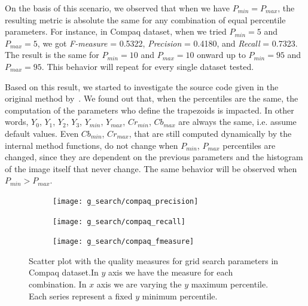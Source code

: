 On the basis of this scenario, we observed that when we have $P_{min} = P_{max}$, the resulting metric is absolute the same for any combination of equal percentile parameters. For instance, in Compaq dataset, when we tried $P_{min} = 5$ and $P_{max} = 5$, we got \emph{F-measure} = 0.5322, \emph{Precision} = 0.4180, and \emph{Recall} = 0.7323. The result is the same for $P_{min} = 10$ and $P_{max} = 10$ onward up to $P_{min} = 95$ and $P_{max} = 95$. This behavior will repeat for every single dataset tested.

Based on this result, we started to investigate the source code given in the original method by~\citet{brancati:17}. We found out that, when the percentiles are the same, the computation of the parameters who define the trapezoids is impacted. In other words, $Y_0$, $Y_1$, $Y_2$, $Y_3$, $Y_{min}$, $Y_{max}$, $Cr_{min}$, $Cb_{max}$ are always the same, i.e. assume default values. Even $Cb_{min}$, $Cr_{max}$, that are still computed dynamically by the internal method functions, do not change when $P_{min}$, $P_{max}$ percentiles are changed, since they are dependent on the previous parameters and the histogram of the image itself that never change. The same behavior will be observed when $P_{min} > P_{max}$.

\clearpage %
\begin{figure}[!htb]
    \centering
    \begin{subfigure}[t]{0.95\textwidth}
        \texttt{[image: g\_search/compaq\_precision]}
    \end{subfigure}
    \begin{subfigure}[t]{0.95\textwidth}
        \texttt{[image: g\_search/compaq\_recall]}
    \end{subfigure}
    \begin{subfigure}[t]{0.95\textwidth}
        \texttt{[image: g\_search/compaq\_fmeasure]}
    \end{subfigure}
    \caption[Scatter plot with the quality measures for grid search parameters in Compaq dataset]{Scatter plot with the quality measures for grid search parameters in Compaq dataset.In $y$ axis we have the measure for each combination. In $x$ axis we are varying the $y$ maximum percentile. Each series represent a fixed $y$ minimum percentile.}
    \label{fig:compaq_g_search}
\end{figure}


